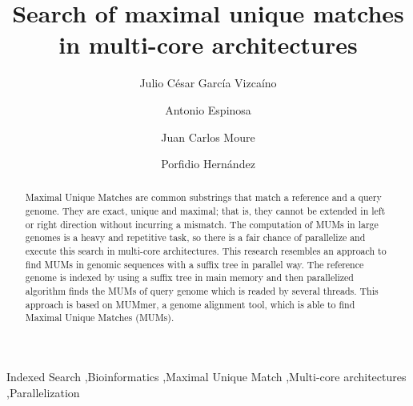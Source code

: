 \documentclass[3p,times]{elsarticle}
\begin{document}
\begin{frontmatter}




\title{Search of maximal unique matches in multi-core architectures}
\author{Julio C\'esar Garc\'ia Vizca\'ino}
\author{Antonio Espinosa}
\author{Juan Carlos Moure}
\author{Porfidio Hern\'andez}
\address{Computer Architecture and Operating Systems, Campus UAB, Edifici Q, 08193 Bellaterra (Barcelona), Spain.}


\author{}

\address{}

\begin{abstract}
  Maximal Unique Matches are common substrings that match a reference and a query genome. They are exact, unique and maximal; that is, they cannot be extended in left or right direction without incurring a mismatch. The computation of MUMs in large genomes is a heavy and repetitive task, so there is a fair chance of parallelize and execute this search in multi-core architectures. This research resembles an approach to find MUMs in genomic sequences with a suffix tree in parallel way. The reference genome is indexed by using a suffix tree in main memory and then parallelized algorithm finds the MUMs of query genome which is readed by several threads. This approach is based on MUMmer, a genome alignment tool, which is able to find Maximal Unique Matches (MUMs). 
\end{abstract}

\begin{keyword}
Indexed Search \sep Bioinformatics \sep Maximal Unique Match \sep Multi-core architectures \sep Parallelization
\end{keyword}

\end{frontmatter}
\end{document}
